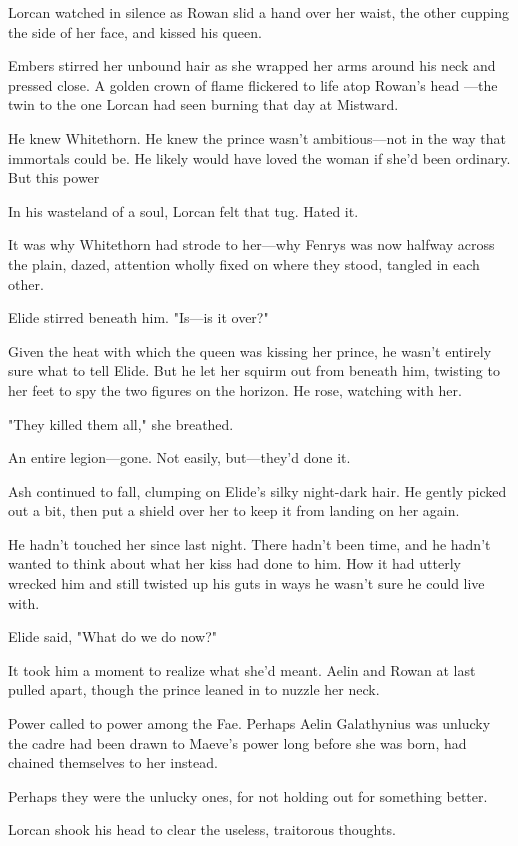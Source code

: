 Lorcan watched in silence as Rowan slid a hand over her waist, the other cupping the side of her face, and kissed his queen.

Embers stirred her unbound hair as she wrapped her arms around his neck and pressed close. A golden crown of flame flickered to life atop Rowan's head ---the twin to the one Lorcan had seen burning that day at Mistward.

He knew Whitethorn. He knew the prince wasn't ambitious---not in the way that immortals could be. He likely would have loved the woman if she'd been ordinary. But this power 

In his wasteland of a soul, Lorcan felt that tug. Hated it.

It was why Whitethorn had strode to her---why Fenrys was now halfway across the plain, dazed, attention wholly fixed on where they stood, tangled in each other.

Elide stirred beneath him. "Is---is it over?"

Given the heat with which the queen was kissing her prince, he wasn't entirely sure what to tell Elide. But he let her squirm out from beneath him, twisting to her feet to spy the two figures on the horizon. He rose, watching with her.

"They killed them all," she breathed.

An entire legion---gone. Not easily, but---they'd done it.

Ash continued to fall, clumping on Elide's silky night-dark hair. He gently picked out a bit, then put a shield over her to keep it from landing on her again.

He hadn't touched her since last night. There hadn't been time, and he hadn't wanted to think about what her kiss had done to him. How it had utterly wrecked him and still twisted up his guts in ways he wasn't sure he could live with.

Elide said, "What do we do now?"

It took him a moment to realize what she'd meant. Aelin and Rowan at last pulled apart, though the prince leaned in to nuzzle her neck.

Power called to power among the Fae. Perhaps Aelin Galathynius was unlucky the cadre had been drawn to Maeve's power long before she was born, had chained themselves to her instead.

Perhaps they were the unlucky ones, for not holding out for something better.

Lorcan shook his head to clear the useless, traitorous thoughts.

